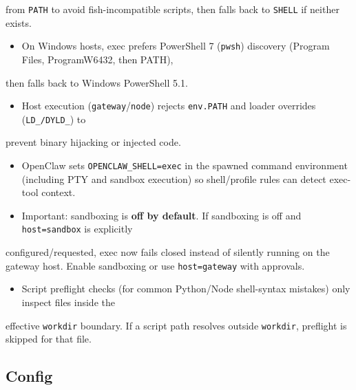 from \texttt{PATH} to avoid fish-incompatible scripts, then falls back to \texttt{SHELL} if neither exists.
\begin{itemize}
  \item On Windows hosts, exec prefers PowerShell 7 (\texttt{pwsh}) discovery (Program Files, ProgramW6432, then PATH),
\end{itemize}

then falls back to Windows PowerShell 5.1.
\begin{itemize}
  \item Host execution (\texttt{gateway}/\texttt{node}) rejects \texttt{env.PATH} and loader overrides (\texttt{LD\_\textit{}/\texttt{DYLD\_}}) to
\end{itemize}

prevent binary hijacking or injected code.
\begin{itemize}
  \item OpenClaw sets \texttt{OPENCLAW\_SHELL=exec} in the spawned command environment (including PTY and sandbox execution) so shell/profile rules can detect exec-tool context.
  \item Important: sandboxing is \textbf{off by default}. If sandboxing is off and \texttt{host=sandbox} is explicitly
\end{itemize}

configured/requested, exec now fails closed instead of silently running on the gateway host.
Enable sandboxing or use \texttt{host=gateway} with approvals.
\begin{itemize}
  \item Script preflight checks (for common Python/Node shell-syntax mistakes) only inspect files inside the
\end{itemize}

effective \texttt{workdir} boundary. If a script path resolves outside \texttt{workdir}, preflight is skipped for
that file.

\subsection{Config}



